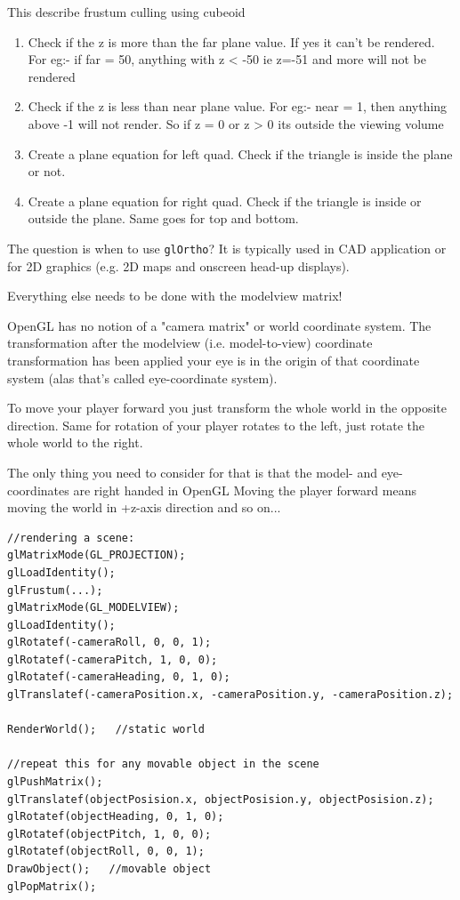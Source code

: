 \begin{framed}
  This describe frustum culling using cubeoid
  \begin{enumerate}
  \item Check if the z is more than the far plane value. If yes it can't
    be rendered. For eg:- if far = 50, anything with z < -50 ie z=-51
    and more will not be rendered

  \item Check if the z is less than near plane value. For eg:- near = 1,
    then anything above -1 will not render. So if z = 0 or z > 0 its
    outside the viewing volume

  \item Create a plane equation for left quad. Check if the triangle is
    inside the plane or not.

  \item Create a plane equation for right quad. Check if the triangle is
    inside or outside the plane.  Same goes for top and bottom.
  \end{enumerate}
\end{framed}


The question is when to use \verb!glOrtho!? It is typically used in
CAD application or for 2D graphics (e.g. 2D maps and onscreen head-up
displays).


Everything else needs to be done with the modelview matrix!

OpenGL has no notion of a "camera matrix" or world coordinate system.
The transformation after the modelview (i.e. model-to-view) coordinate
transformation has been applied your eye is in the origin of that
coordinate system (alas that's called eye-coordinate system).

To move your player forward you just transform the whole world in the opposite direction. Same for rotation of your player rotates to the left, just rotate the whole world to the right.

The only thing you need to consider for that is that the model- and
eye-coordinates are right handed in OpenGL Moving the player forward
means moving the world in +z-axis direction and so on...

\begin{verbatim}
//rendering a scene:
glMatrixMode(GL_PROJECTION);
glLoadIdentity();
glFrustum(...);
glMatrixMode(GL_MODELVIEW);
glLoadIdentity();
glRotatef(-cameraRoll, 0, 0, 1);
glRotatef(-cameraPitch, 1, 0, 0);
glRotatef(-cameraHeading, 0, 1, 0);
glTranslatef(-cameraPosition.x, -cameraPosition.y, -cameraPosition.z);

RenderWorld();   //static world

//repeat this for any movable object in the scene
glPushMatrix();
glTranslatef(objectPosision.x, objectPosision.y, objectPosision.z);
glRotatef(objectHeading, 0, 1, 0);
glRotatef(objectPitch, 1, 0, 0);
glRotatef(objectRoll, 0, 0, 1);
DrawObject();   //movable object
glPopMatrix();

\end{verbatim}

